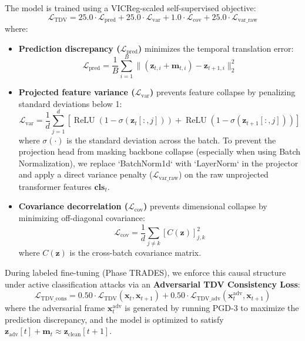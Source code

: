 \documentclass[12pt,a4paper]{article}
\begin{document}
The model is trained using a VICReg-scaled self-supervised objective:
\begin{equation}
  \mathcal{L}_{\text{TDV}} = 25.0 \cdot \mathcal{L}_{\text{pred}} + 25.0 \cdot \mathcal{L}_{\text{var}} + 1.0 \cdot \mathcal{L}_{\text{cov}} + 25.0 \cdot \mathcal{L}_{\text{var\_raw}}
  \label{eq:tdv_loss}
\end{equation}
where:
\begin{itemize}[leftmargin=1.5em]
  \item \textbf{Prediction discrepancy ($\mathcal{L}_{\text{pred}}$)} minimizes the temporal translation error:
        \begin{equation}
          \mathcal{L}_{\text{pred}} = \frac{1}{B} \sum_{i=1}^{B} \|(\mathbf{z}_{t,i} + \mathbf{m}_{t,i}) - \mathbf{z}_{t+1,i} \|_2^2
        \end{equation}
  \item \textbf{Projected feature variance ($\mathcal{L}_{\text{var}}$)} prevents feature collapse by penalizing standard deviations below 1:
        \begin{equation}
          \mathcal{L}_{\text{var}} = \frac{1}{d} \sum_{j=1}^{d} \left[ \operatorname{ReLU}(1 - \sigma(\mathbf{z}_{t}[:, j])) + \operatorname{ReLU}(1 - \sigma(\mathbf{z}_{t+1}[:, j])) \right]
        \end{equation}
        where $\sigma(\cdot)$ is the standard deviation across the batch. To prevent the projection head from masking backbone collapse (especially when using Batch Normalization), we replace `BatchNorm1d` with `LayerNorm` in the projector and apply a direct variance penalty ($\mathcal{L}_{\text{var\_raw}}$) on the raw unprojected transformer features $\mathbf{cls}_t$.
  \item \textbf{Covariance decorrelation ($\mathcal{L}_{\text{cov}}$)} prevents dimensional collapse by minimizing off-diagonal covariance:
        \begin{equation}
          \mathcal{L}_{\text{cov}} = \frac{1}{d} \sum_{j \neq k} [C(\mathbf{z})]^2_{j, k}
        \end{equation}
        where $C(\mathbf{z})$ is the cross-batch covariance matrix.
\end{itemize}

During labeled fine-tuning (Phase TRADES), we enforce this causal structure under active classification attacks via an \textbf{Adversarial TDV Consistency Loss}:
\begin{equation}
  \mathcal{L}_{\text{TDV\_cons}} = 0.50 \cdot \mathcal{L}_{\text{TDV}}(\mathbf{x}_t, \mathbf{x}_{t+1}) + 0.50 \cdot \mathcal{L}_{\text{TDV\_adv}}(\mathbf{x}_t^{\text{adv}}, \mathbf{x}_{t+1})
  \label{eq:tdv_cons}
\end{equation}
where the adversarial frame $\mathbf{x}_t^{\text{adv}}$ is generated by running PGD-3 to maximize the prediction discrepancy, and the model is optimized to satisfy $\mathbf{z}_{\text{adv}}[t] + \mathbf{m}_t \approx \mathbf{z}_{\text{clean}}[t+1]$.
\end{document}
